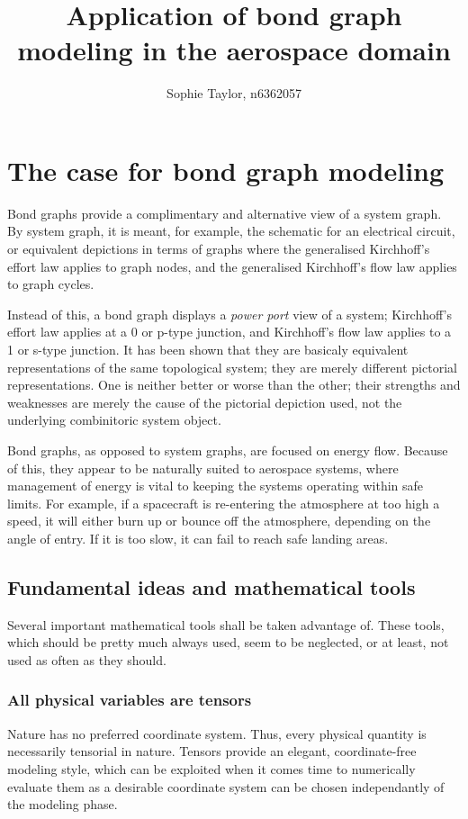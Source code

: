 \documentclass[utf,a4paper,12pt]{report}
\title{Application of bond graph modeling in the aerospace domain}
\author{Sophie Taylor, n6362057}
\begin{document}
\maketitle
\tableofcontents

\chapter{The case for bond graph modeling}
Bond graphs provide a complimentary and alternative view of a system graph. By system graph, it is meant, for example, the schematic for an electrical circuit, or equivalent depictions in terms of graphs where the generalised Kirchhoff's effort law applies to graph nodes, and the generalised Kirchhoff's flow law applies to graph cycles.

 Instead of this, a bond graph displays a \emph{power port} view of a system; Kirchhoff's effort law applies at a 0 or p-type junction, and Kirchhoff's flow law applies to a 1 or s-type junction. It has been shown that they are basicaly equivalent representations of the same topological system; they are merely different pictorial representations. One is neither better or worse than the other; their strengths and weaknesses are merely the cause of the pictorial depiction used, not the underlying combinitoric system object.

Bond graphs, as opposed to system graphs, are focused on energy flow. Because of this, they appear to be naturally suited to aerospace systems, where management of energy is vital to keeping the systems operating within safe limits. For example, if a spacecraft is re-entering the atmosphere at too high a speed, it will either burn up or bounce off the atmosphere, depending on the angle of entry. If it is too slow, it can fail to reach safe landing areas.
\section{Fundamental ideas and mathematical tools}
Several important mathematical tools shall be taken advantage of. These tools, which should be pretty much always used, seem to be neglected, or at least, not used as often as they should.
\subsection{All physical variables are tensors}
Nature has no preferred coordinate system. Thus, every physical quantity is necessarily tensorial in nature. Tensors provide an elegant, coordinate-free modeling style, which can be exploited when it comes time to numerically evaluate them as a desirable coordinate system can be chosen independantly of the modeling phase.
\end{document}
